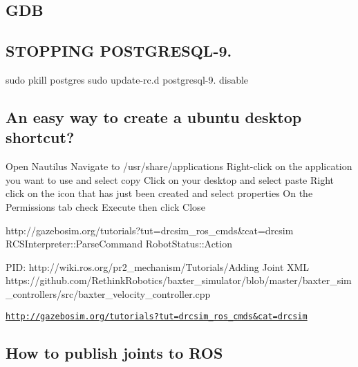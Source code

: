 \subsection*{G\-D\-B }



\subsection*{S\-T\-O\-P\-P\-I\-N\-G P\-O\-S\-T\-G\-R\-E\-S\-Q\-L-\/9. }

sudo pkill postgres sudo update-\/rc.\-d postgresql-\/9. disable

\subsection*{An easy way to create a ubuntu desktop shortcut? }

Open Nautilus Navigate to /usr/share/applications Right-\/click on the application you want to use and select copy Click on your desktop and select paste Right click on the icon that has just been created and select properties On the Permissions tab check Execute then click Close

\begin{DoxyVerb}http://gazebosim.org/tutorials?tut=drcsim_ros_cmds&cat=drcsim
RCSInterpreter::ParseCommand
RobotStatus::Action

PID: http://wiki.ros.org/pr2_mechanism/Tutorials/Adding%
Joint XML https://github.com/RethinkRobotics/baxter_simulator/blob/master/baxter_sim_controllers/src/baxter_velocity_controller.cpp
\end{DoxyVerb}


\href{http://gazebosim.org/tutorials?tut=drcsim_ros_cmds&cat=drcsim}{\tt http\-://gazebosim.\-org/tutorials?tut=drcsim\-\_\-ros\-\_\-cmds\&cat=drcsim}

\subsection*{How to publish joints to R\-O\-S }

